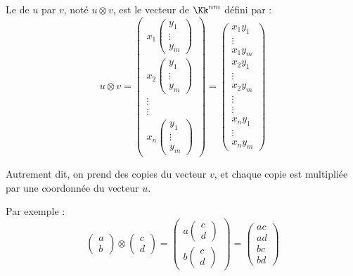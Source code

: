 \documentclass[11pt,class=report,crop=false]{standalone}
\begin{document}
Le  de $u$ par $v$, noté $u \otimes v$, est le vecteur de $\Kk^{nm}$ défini par :
$$
u \otimes v
= \begin{pmatrix}
x_1 \begin{pmatrix}y_1\\ \vdots\\y_m\end{pmatrix}\\
x_2\begin{pmatrix}y_1\\ \vdots\\y_m\end{pmatrix}\\
\vdots\\
\vdots\\
x_n\begin{pmatrix}y_1\\\vdots\\y_m\end{pmatrix}\end{pmatrix}
= 
\begin{pmatrix}
x_1 y_1\\\vdots\\x_1 y_m\\x_2 y_1\\\vdots\\x_2 y_m\\\vdots\\\vdots
\\x_n y_1\\\vdots\\x_n y_m\end{pmatrix}
$$

Autrement dit, on  prend des copies du vecteur $v$, et chaque copie est multipliée par une coordonnée du vecteur $u$.

Par exemple :
$$\begin{pmatrix}a\\b\end{pmatrix}\otimes\begin{pmatrix}c\\d\end{pmatrix}
= \begin{pmatrix}a\begin{pmatrix}c\\d\end{pmatrix}\\b\begin{pmatrix}c\\d\end{pmatrix}\end{pmatrix}
= \begin{pmatrix}ac\\ad\\bc\\bd\end{pmatrix}$$
\end{document}
